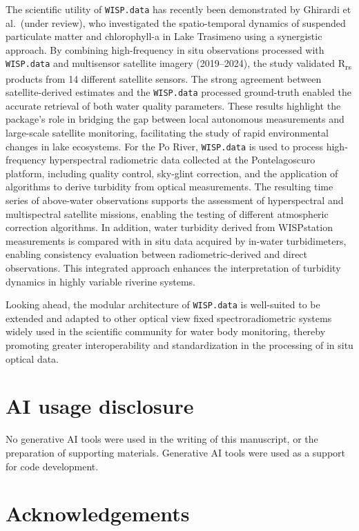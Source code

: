 \documentclass[
]{article}
\begin{document}
The scientific utility of \texttt{WISP.data} has recently been
demonstrated by Ghirardi et al.~(under review), who investigated the
spatio-temporal dynamics of suspended particulate matter and
chlorophyll-a in Lake Trasimeno using a synergistic approach. By
combining high-frequency in situ observations processed with
\texttt{WISP.data} and multisensor satellite imagery (2019--2024), the
study validated R\textsubscript{rs} products from 14 different satellite
sensors. The strong agreement between satellite-derived estimates and
the \texttt{WISP.data} processed ground-truth enabled the accurate
retrieval of both water quality parameters. These results highlight the
package's role in bridging the gap between local autonomous measurements
and large-scale satellite monitoring, facilitating the study of rapid
environmental changes in lake ecosystems. For the Po River,
\texttt{WISP.data} is used to process high-frequency hyperspectral
radiometric data collected at the Pontelagoscuro platform, including
quality control, sky-glint correction, and the application of algorithms
to derive turbidity from optical measurements. The resulting time series
of above-water observations supports the assessment of hyperspectral and
multispectral satellite missions, enabling the testing of different
atmospheric correction algorithms. In addition, water turbidity derived
from WISPstation measurements is compared with in situ data acquired by
in-water turbidimeters, enabling consistency evaluation between
radiometric-derived and direct observations. This integrated approach
enhances the interpretation of turbidity dynamics in highly variable
riverine systems.

Looking ahead, the modular architecture of \texttt{WISP.data} is
well-suited to be extended and adapted to other optical view fixed
spectroradiometric systems widely used in the scientific community for
water body monitoring, thereby promoting greater interoperability and
standardization in the processing of in situ optical data.

\section{AI usage disclosure}\label{ai-usage-disclosure}

No generative AI tools were used in the writing of this manuscript, or
the preparation of supporting materials. Generative AI tools were used
as a support for code development.

\section{Acknowledgements}\label{acknowledgements}
\end{document}
